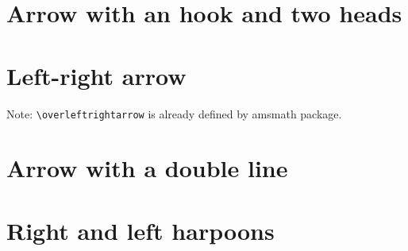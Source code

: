 \documentclass{article}
\begin{document}
\section{Arrow with an hook and two heads}

\begin{dispExample}
\TestOverArrow{\overhooktwoheadrightarrow}
\end{dispExample}

\section{Left-right arrow}

Note: \texttt{\textbackslash overleftrightarrow} is already defined by
\textsf{amsmath} package.

\begin{dispExample}
\TestOverArrow{\overleftrightarrow}
\end{dispExample}

\section{Arrow with a double line}

\begin{dispExample}
\TestOverArrow{\OverRightarrow}
\end{dispExample}

\section{Right and left harpoons}

\begin{dispExample}
\TestOverArrow{\overrightharpoon}
\end{dispExample}

\begin{dispExample}
\TestOverArrow{\overleftharpoon}
\end{dispExample}
\end{document}
